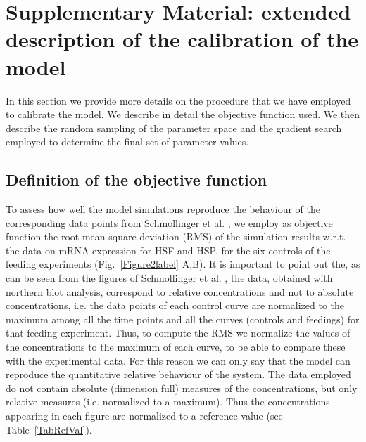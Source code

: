\documentclass[oneside, 10pt, a4paper, twocolumn]{article}
\begin{document}
\clearpage




\section{Supplementary Material: extended description of the calibration of the model}
\label{SecCalibrationExtended}

In this section we provide more details on the procedure that we have employed to calibrate the model. We describe in detail the objective function used. We then describe the random sampling of the parameter space and the gradient search employed to determine the final set of parameter values.

\subsection{Definition of the objective function}

To assess how well the model simulations reproduce the behaviour of the corresponding data points from Schmollinger et al. \cite{Schmollinger2013}, we employ as objective function the root mean square deviation (RMS) of the simulation results w.r.t. the data on mRNA expression for HSF and HSP, for the six controls of the feeding experiments (Fig.~\ref{Figure2label} A,B). 
It is important to point out the, as can be seen from the figures of Schmollinger et al. \cite{Schmollinger2013}, the data, obtained with northern blot analysis, correspond to relative concentrations and not to absolute concentrations, i.e. the data points of each control curve are normalized to the maximum among all the time points and all the curves (controls and feedings) for that feeding experiment. Thus, to compute the RMS we normalize the values of the concentrations to the maximum of each curve, to be able to compare these with the experimental data. For this reason we can only say that the model can reproduce the quantitative relative behaviour of the system. The data employed do not contain absolute (dimension full) measures of the concentrations, but only relative measures (i.e. normalized to a maximum). Thus the concentrations appearing in each figure are normalized to a reference value (see Table~\ref{TabRefVal}).
\end{document}
